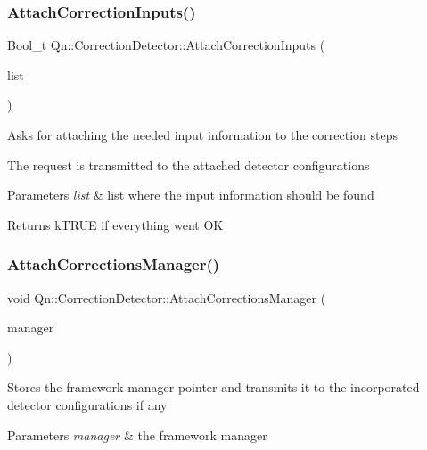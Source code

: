 \subsubsection{\texorpdfstring{Attach\+Correction\+Inputs()}{AttachCorrectionInputs()}}
{\footnotesize\ttfamily Bool\+\_\+t Qn\+::\+Correction\+Detector\+::\+Attach\+Correction\+Inputs (\begin{DoxyParamCaption}\item[{T\+List $\ast$}]{list }\end{DoxyParamCaption})}

Asks for attaching the needed input information to the correction steps

The request is transmitted to the attached detector configurations 
\begin{DoxyParams}{Parameters}
{\em list} & list where the input information should be found \\
\hline
\end{DoxyParams}
\begin{DoxyReturn}{Returns}
k\+T\+R\+UE if everything went OK 
\end{DoxyReturn}
\mbox{\label{classQn_1_1CorrectionDetector_a8de962ff8acbffdcfb15eba90a3a91ed}} 
\subsubsection{\texorpdfstring{Attach\+Corrections\+Manager()}{AttachCorrectionsManager()}}
{\footnotesize\ttfamily void Qn\+::\+Correction\+Detector\+::\+Attach\+Corrections\+Manager (\begin{DoxyParamCaption}\item[{\mbox{\hyperlink{classQn_1_1CorrectionCalculator}{Correction\+Calculator}} $\ast$}]{manager }\end{DoxyParamCaption})}

Stores the framework manager pointer and transmits it to the incorporated detector configurations if any


\begin{DoxyParams}{Parameters}
{\em manager} & the framework manager \\
\hline
\end{DoxyParams}
\mbox{\label{classQn_1_1CorrectionDetector_a9ff746e0a0128405bb37ffc0384fe114}} 
